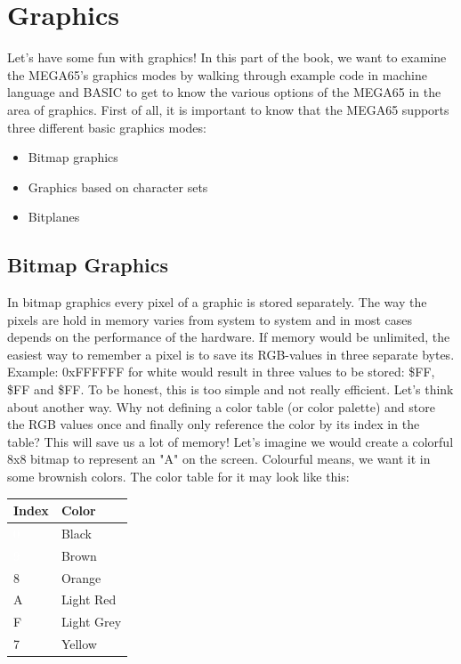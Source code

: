 
\newcommand{\blkb}{\cellcolor[rgb]{0,0,0}\textcolor{white} 0 }
\newcommand{\bwn}{\cellcolor[rgb]{.26,.22,0}\textcolor{white} 9 }
\newcommand{\ora}{\cellcolor[rgb]{.44,.31,.15}8 }
\newcommand{\red}{\cellcolor[rgb]{.6,.4,.35}A }
\newcommand{\lgr}{\cellcolor[rgb]{.58,.58,.58}F }
\newcommand{\yel}{\cellcolor[rgb]{.72,.78,.44}7 }

\newcommand{\redb}{\cellcolor[rgb]{.6,.4,.35} 1 }

\chapter{Graphics}
\label{cha:graphics}

Let's have some fun with graphics!
In this part of the book, we want to examine the MEGA65's graphics modes by walking through example code in machine language and BASIC to get to know the various options of the MEGA65 in the area of graphics. First of all, it is important to know that the MEGA65 supports three different basic graphics modes:

\begin{itemize}
	\item Bitmap graphics
	\item Graphics based on character sets
	\item Bitplanes
\end{itemize}


\section*{Bitmap Graphics}

In bitmap graphics every pixel of a graphic is stored separately. The way the pixels are hold in memory varies from system to system and in most cases depends on the performance of the hardware. If memory would be unlimited, the easiest way to remember a pixel is to save its RGB-values in three separate bytes. Example: 0xFFFFFF for white would result in three values to be stored: \$FF, \$FF and \$FF. To be honest, this is too simple and not really efficient. Let’s think about another way. Why not defining a color table (or color palette) and store the RGB values once and finally only reference the color by its index in the table? This will save us a lot of memory! Let's imagine we would create a colorful 8x8 bitmap to represent an "A" on the screen. Colourful means, we want it in some brownish colors. The color table for it may look like this:

\begin{center}
\begin{tabular}{|l|l|}
\hline
	Index & Color \\
\hline
	\blkb & Black \\
	\bwn & Brown \\
	\ora & Orange \\
	\red & Light Red \\
	\lgr & Light Grey \\
	\yel & Yellow \\
\hline
\end{tabular}
\end{center}

